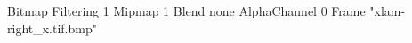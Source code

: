 {Bitmap
	{Filtering 1}
	{Mipmap 1}
	{Blend none}
	{AlphaChannel 0}
	{Frame "xlam-right_x.tif.bmp"}
}

